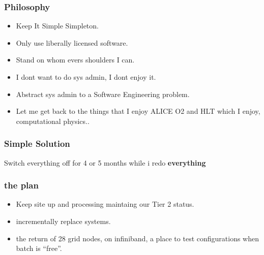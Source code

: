 \documentclass{beamer}
\begin{document}
\begin{frame}
  \frametitle{Philosophy}
  \begin{itemize}
    \item Keep It Simple Simpleton.
    \item Only use liberally licensed software.
    \item Stand on whom evers shoulders I can.
    \item I dont want to do sys admin, I dont enjoy it.
    \item Abstract sys admin to a Software Engineering problem.
    \item Let me get back to the things that I enjoy ALICE O2 and HLT which I enjoy, computational physics..
  \end{itemize}
\end{frame}

\begin{frame}
  \frametitle{Simple Solution}
  Switch everything off for 4 or 5 months while i redo \bf{everything}
\end{frame}

\begin{frame}
  \frametitle{the plan}
  \begin{itemize}
    \item Keep site up and processing maintaing our Tier 2 status.
    \item incrementally replace systems.
    \item the return of 28 grid nodes, on infiniband, a place to test configurations when batch is ``free''.
  \end{itemize}
\end{frame}
\end{document}
